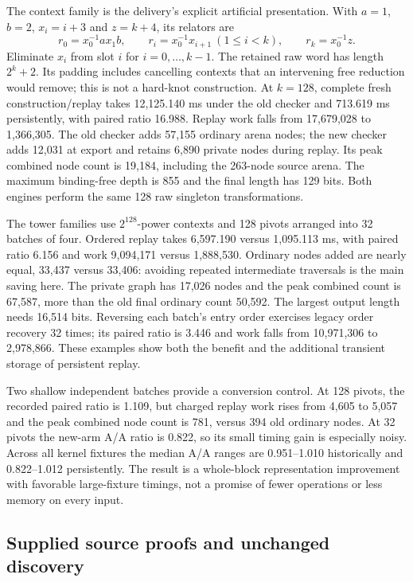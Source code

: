 

The context family is the delivery's explicit artificial presentation. With
$a=1$, $b=2$, $x_i=i+3$ and $z=k+4$, its relators are
\[
 r_0=x_0^{-1}a x_1b,\qquad
 r_i=x_0^{-1}x_{i+1}\ (1\le i<k),\qquad
 r_k=x_0^{-1}z.
\]
Eliminate $x_i$ from slot $i$ for $i=0,\ldots,k-1$. The retained raw word
has length $2^k+2$. Its padding includes cancelling contexts that an intervening
free reduction would remove; this is not a hard-knot construction.
At $k=128$, complete fresh construction/replay takes 12,125.140 ms under the
old checker and 713.619 ms persistently, with paired ratio 16.988. Replay work
falls from 17,679,028 to 1,366,305. The old checker adds 57,155 ordinary arena
nodes; the new checker adds 12,031 at export and retains 6,890 private nodes
during replay. Its peak combined node count is 19,184, including the 263-node
source arena. The maximum binding-free depth is 855 and the final length has
129 bits. Both engines perform the same 128 raw singleton transformations.

The tower families use $2^{128}$-power contexts and 128 pivots arranged into
32 batches of four. Ordered replay takes 6,597.190 versus 1,095.113 ms,
with paired ratio 6.156 and work 9,094,171 versus 1,888,530. Ordinary nodes
added are nearly equal, 33,437 versus 33,406: avoiding repeated intermediate
traversals is the main saving here. The private graph has 17,026 nodes and
the peak combined count is 67,587, more than the old final ordinary count
50,592. The largest output length needs 16,514 bits. Reversing each batch's
entry order exercises legacy order recovery 32 times; its paired ratio is
3.446 and work falls from 10,971,306 to 2,978,866. These examples show both
the benefit and the additional transient storage of persistent replay.

Two shallow independent batches provide a conversion control. At 128 pivots,
the recorded paired ratio is 1.109, but charged replay work rises from 4,605
to 5,057 and the peak combined node count is 781, versus 394 old ordinary
nodes. At 32 pivots the new-arm A/A ratio is 0.822, so its small timing gain
is especially noisy. Across all kernel fixtures the median A/A ranges are
0.951--1.010 historically and 0.822--1.012 persistently. The result is a
whole-block representation improvement with favorable large-fixture timings,
not a promise of fewer operations or less memory on every input.

\subsection{Supplied source proofs and unchanged discovery}

